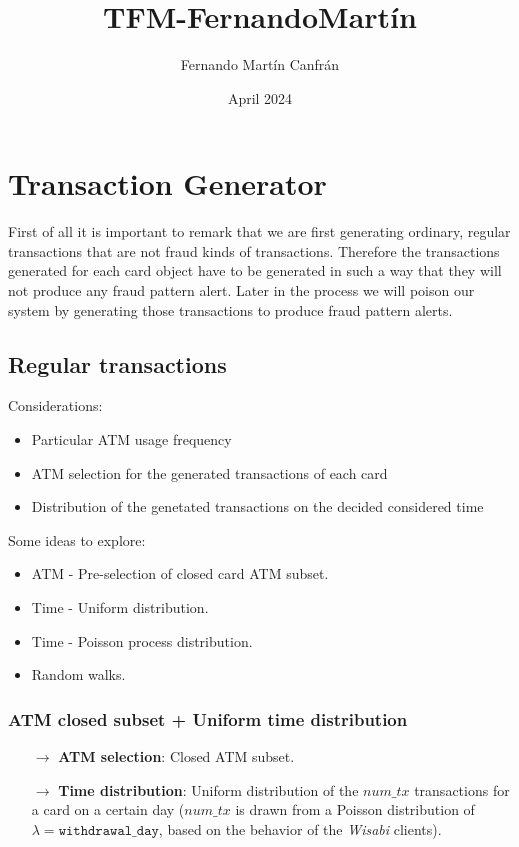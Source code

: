 \documentclass{article}
\title{TFM-FernandoMartín}
\author{Fernando Martín Canfrán}
\date{April 2024}
\begin{document}
\section{Transaction Generator}

First of all it is important to remark that we are first generating ordinary, 
regular transactions that are not fraud kinds of transactions. Therefore the 
transactions generated for each card object have to be generated in such a way
that they will not produce any fraud pattern alert. Later in the process we 
will poison our system by generating those transactions to produce fraud pattern 
alerts.

\subsection{Regular transactions}

Considerations:

\begin{itemize}
  \item Particular ATM usage frequency
  \item ATM selection for the generated transactions of each card
  \item Distribution of the genetated transactions on the decided considered time
\end{itemize}

Some ideas to explore:

\begin{itemize}
  \item ATM - Pre-selection of closed card ATM subset.
  \item Time - Uniform distribution. 
  \item Time - Poisson process distribution.
  \item Random walks.
\end{itemize}

\subsubsection{ATM closed subset + Uniform time distribution}

\begin{tcolorbox}
  \begin{itemize}
    \item[$\rightarrow$] \textbf{ATM selection}: Closed ATM subset.
    \item[$\rightarrow$] \textbf{Time distribution}: Uniform distribution of the $num\_tx$ transactions 
    for a card on a certain day ($num\_tx$ is drawn from a Poisson distribution of 
    $\lambda = \texttt{withdrawal\_day}$, based on the behavior of the \emph{Wisabi} clients).
  \end{itemize}
\end{tcolorbox}
\end{document}
